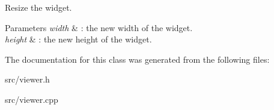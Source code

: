 Resize the widget. 


\begin{DoxyParams}{Parameters}
{\em width} & \+: the new width of the widget. \\
\hline
{\em height} & \+: the new height of the widget. \\
\hline
\end{DoxyParams}


The documentation for this class was generated from the following files\+:\begin{DoxyCompactItemize}
\item 
src/viewer.\+h\item 
src/viewer.\+cpp\end{DoxyCompactItemize}
